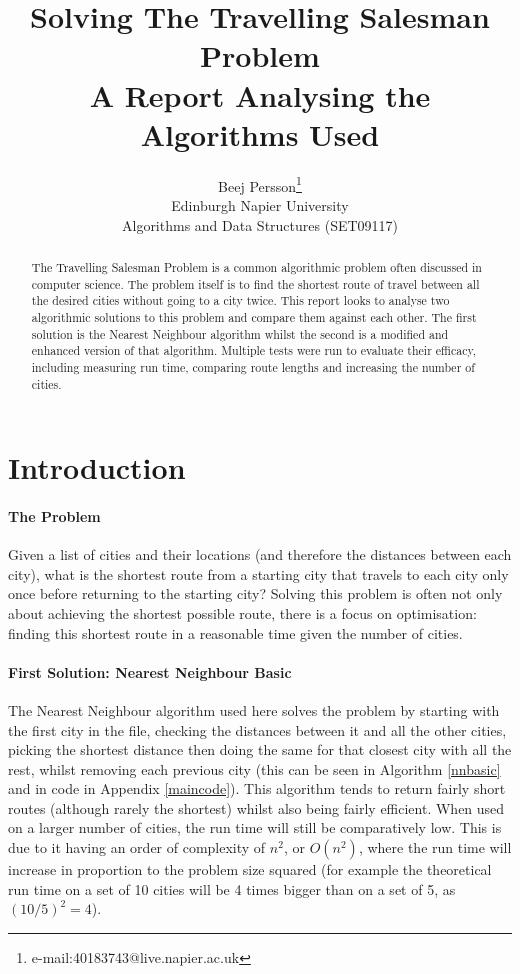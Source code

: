 \documentclass[conference,backref=page]{acmsiggraph}
\title{Solving The Travelling Salesman Problem\\
	   A Report Analysing the Algorithms Used}
\author{Beej Persson\thanks{e-mail:40183743@live.napier.ac.uk} \\
Edinburgh Napier University\\
Algorithms and Data Structures (SET09117)}
\begin{document}
\maketitle

\raggedbottom

\begin{abstract}

The Travelling Salesman Problem is a common algorithmic problem often discussed in computer science. The problem itself is to find the shortest route of travel between all the desired cities without going to a city twice. This report looks to analyse two algorithmic solutions to this problem and compare them against each other. The first solution is the Nearest Neighbour algorithm whilst the second is a modified and enhanced version of that algorithm. Multiple tests were run to evaluate their efficacy, including measuring run time, comparing route lengths and increasing the number of cities.

\end{abstract}

\keywordlist

\section{Introduction}

\paragraph{The Problem}
Given a list of cities and their locations (and therefore the distances between each city), what is the shortest route from a starting city that travels to each city only once before returning to the starting city? Solving this problem is often not only about achieving the shortest possible route, there is a focus on optimisation: finding this shortest route in a reasonable time given the number of cities.

\paragraph{First Solution: Nearest Neighbour Basic}
The Nearest Neighbour algorithm used here solves the problem by starting with the first city in the file, checking the distances between it and all the other cities, picking the shortest distance then doing the same for that closest city with all the rest, whilst removing each previous city (this can be seen in Algorithm \ref{nnbasic} and in code in Appendix \ref{maincode}). This algorithm tends to return fairly short routes (although rarely the shortest) whilst also being fairly efficient. When used on a larger number of cities, the run time will still be comparatively low. This is due to it having an order of complexity of $n^2$, or $O(n^2)$, where the run time will increase in proportion to the problem size squared (for example the theoretical run time on a set of 10 cities will be 4 times bigger than on a set of 5, as $(10/5)^2 = 4$).
\end{document}
